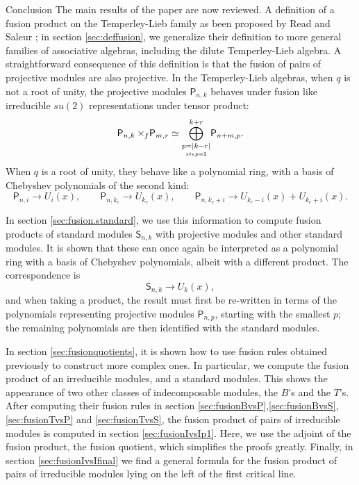 \documentclass[reqno]{amsart}
\newcommand{\ds}[1]{\mathsf S_{#1}}
\newcommand{\dP}[1]{\mathsf P_{#1}}
\newcommand{\kc}{k_c}
\newcommand{\xf}{\times\hspace{-0.27em}_f}
\begin{document}
\begin{section}{Conclusion}
The main results of the paper are now reviewed. A definition of a fusion product on the Temperley-Lieb family as been proposed by Read and Saleur \cite{ReadSaleur1,ReadSaleur2}; in section \ref{sec:deffusion}, we generalize their definition to more general families of associative algebras, including the dilute Temperley-Lieb algebra. A straightforward consequence of this definition is that the fusion of pairs of projective modules are also projective. In the Temperley-Lieb algebras, when $q$ is not a root of unity, the projective modules $\dP{n,k}$ behaves under fusion like irreducible $su(2)$ representations under tensor product: $$\dP{n,k} \xf \dP{m,r} \simeq \overset{k+r}{\underset{\underset{step =2}{p = |k-r|}}{\bigoplus}} \dP{n+m,p}. $$
When $q$ is a root of unity, they behave like a polynomial ring, with a basis of Chebyshev polynomials of the second kind:
$$\dP{n,i} \to U_{i}(x), \qquad \dP{n,\kc} \to U_{\kc}(x), \qquad \dP{n,\kc +i} \to U_{\kc-i}(x) + U_{\kc+i}(x).$$

In section \ref{sec:fusion.standard}, we use this information to compute fusion products of standard modules $\ds{n,k}$ with projective modules and other standard modules. It is shown that these can once again be interpreted as a polynomial ring with a basis of Chebyshev polynomials, albeit with a different product. The correspondence is $$\ds{n,k} \to U_{k}(x),$$ and when taking a product, the result must first be re-written in terms of the polynomials representing projective modules $\dP{n,p}$, starting with the smallest $p$; the remaining polynomials are then identified with the standard modules.

In section \ref{sec:fusionquotients}, it is shown how to use fusion rules obtained previously to construct more complex ones. In particular, we compute the fusion product of an irreducible modules, and a standard modules. This shows the appearance of two other classes of indecomposable modules, the $B$'s and the $T$'s. After computing their fusion rules in section \ref{sec:fusionBvsP},\ref{sec:fusionBvsS},\ref{sec:fusionTvsP} and \ref{sec:fusionTvsS}, the fusion product of pairs of irreducible modules is computed in section \ref{sec:fusionIvsIp1}. Here, we use the adjoint of the fusion product, the fusion quotient, which simplifies the proofs greatly. Finally, in section \ref{sec:fusionIvsIfinal} we find a general formula for the fusion product of pairs of irreducible modules lying on the left of the first critical line.


\end{section}
\end{document}
